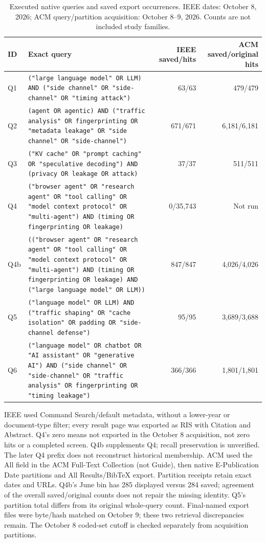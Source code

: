 \begin{table}[t]
\centering\footnotesize
\caption{Executed native queries and saved export occurrences. IEEE dates: October 8, 2026; ACM query/partition acquisition: October 8--9, 2026. Counts are not included study families.}
\label{tab:native-executable-queries}
\begin{tabularx}{\textwidth}{@{}lXrr@{}}
\toprule
ID & Exact query & IEEE saved/hits & ACM saved/original hits\\
\midrule
Q1 & \texttt{("large language model" OR LLM) AND ("side channel" OR "side-channel" OR "timing attack")} & 63/63 & 479/479\\
Q2 & \texttt{(agent OR agentic) AND ("traffic analysis" OR fingerprinting OR "metadata leakage" OR "side channel" OR "side-channel")} & 671/671 & 6,181/6,181\\
Q3 & \texttt{("KV cache" OR "prompt caching" OR "speculative decoding") AND (privacy OR leakage OR attack)} & 37/37 & 511/511\\
Q4 & \texttt{("browser agent" OR "research agent" OR "tool calling" OR "model context protocol" OR "multi-agent") AND (timing OR fingerprinting OR leakage)} & 0/35,743 & Not run\\
Q4b & \texttt{(("browser agent" OR "research agent" OR "tool calling" OR "model context protocol" OR "multi-agent") AND (timing OR fingerprinting OR leakage) AND ("large language model" OR LLM))} & 847/847 & 4,026/4,026\\
Q5 & \texttt{("language model" OR LLM) AND ("traffic shaping" OR "cache isolation" OR padding OR "side-channel defense")} & 95/95 & 3,689/3,688\\
Q6 & \texttt{("language model" OR chatbot OR "AI assistant" OR "generative AI") AND ("side channel" OR "side-channel" OR "traffic analysis" OR fingerprinting OR "timing leakage")} & 366/366 & 1,801/1,801\\
\bottomrule
\end{tabularx}
\par\smallskip\footnotesize\raggedright
IEEE used Command Search/default metadata, without a lower-year or document-type filter; every result page was exported as RIS with Citation and Abstract. Q4's zero means not exported in the October 8 acquisition, not zero hits or a completed screen. Q4b supplements Q4; recall preservation is unverified. The later Q4 prefix does not reconstruct historical membership.
ACM used the All field in the ACM Full-Text Collection (not Guide), then native E-Publication Date partitions and All Results/BibTeX export. Partition receipts retain exact dates and URLs. Q4b's June bin has 285 displayed versus 284 saved; agreement of the overall saved/original counts does not repair the missing identity. Q5's partition total differs from its original whole-query count. Final-named export files were byte/hash matched on October 9; these two retrieval discrepancies remain. The October 8 coded-set cutoff is checked separately from acquisition partitions.
\end{table}
